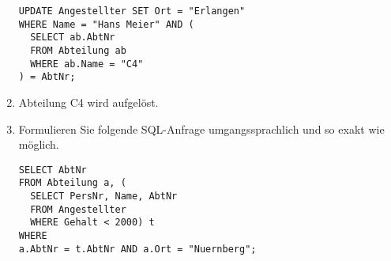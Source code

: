\documentclass{lehramt-informatik-aufgabe}
\begin{document}
\begin{enumerate}
\begin{antwort}[muster]
\begin{verbatim}
UPDATE Angestellter SET Ort = "Erlangen"
WHERE Name = "Hans Meier" AND (
  SELECT ab.AbtNr
  FROM Abteilung ab
  WHERE ab.Name = "C4"
) = AbtNr;
\end{verbatim}
\end{antwort}


\item Abteilung C4 wird aufgelöst.


\item Formulieren Sie folgende SQL-Anfrage umgangssprachlich und so
exakt wie möglich.

\begin{verbatim}
SELECT AbtNr
FROM Abteilung a, (
  SELECT PersNr, Name, AbtNr
  FROM Angestellter
  WHERE Gehalt < 2000) t
WHERE
a.AbtNr = t.AbtNr AND a.Ort = "Nuernberg";
\end{verbatim}

\end{enumerate}
\end{document}
